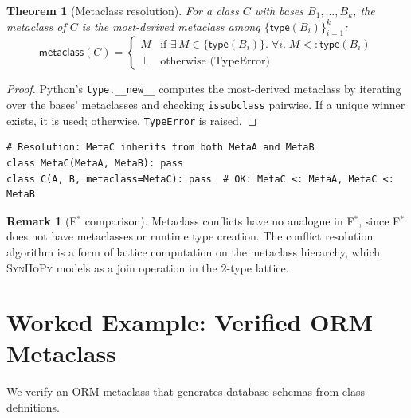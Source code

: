 \documentclass[11pt,a4paper]{report}
\theoremstyle{definition}
\newtheorem{remark}[definition]{Remark}
\theoremstyle{plain}
\newtheorem{theorem}[definition]{Theorem}
\newcommand{\fstar}{F$^{*}$}
\newcommand{\synhopy}{\textsc{SynHoPy}}
\begin{document}
\begin{theorem}[Metaclass resolution]
\label{thm:meta-resolve}
For a class $C$ with bases $B_1, \ldots, B_k$, the metaclass of $C$ is
the most-derived metaclass among $\{\mathsf{type}(B_i)\}_{i=1}^{k}$:
\[
  \mathsf{metaclass}(C) =
  \begin{cases}
    M & \text{if } \exists\, M \in \{\mathsf{type}(B_i)\}.\;
        \forall i.\; M <: \mathsf{type}(B_i) \\
    \bot & \text{otherwise (TypeError)}
  \end{cases}
\]
\end{theorem}
\begin{proof}
Python's \lstinline[style=python]{type.__new__} computes the most-derived
metaclass by iterating over the bases' metaclasses and checking
\lstinline[style=python]{issubclass} pairwise.  If a unique winner exists,
it is used; otherwise, \lstinline[style=python]{TypeError} is raised.
\end{proof}

\begin{lstlisting}[style=python]
# Resolution: MetaC inherits from both MetaA and MetaB
class MetaC(MetaA, MetaB): pass
class C(A, B, metaclass=MetaC): pass  # OK: MetaC <: MetaA, MetaC <: MetaB
\end{lstlisting}

\begin{remark}[\fstar{} comparison]
Metaclass conflicts have no analogue in \fstar{}, since \fstar{} does not
have metaclasses or runtime type creation.  The conflict resolution
algorithm is a form of lattice computation on the metaclass hierarchy,
which \synhopy{} models as a join operation in the 2-type lattice.
\end{remark}

\section{Worked Example: Verified ORM Metaclass}

We verify an ORM metaclass that generates database schemas from
class definitions.
\end{document}
